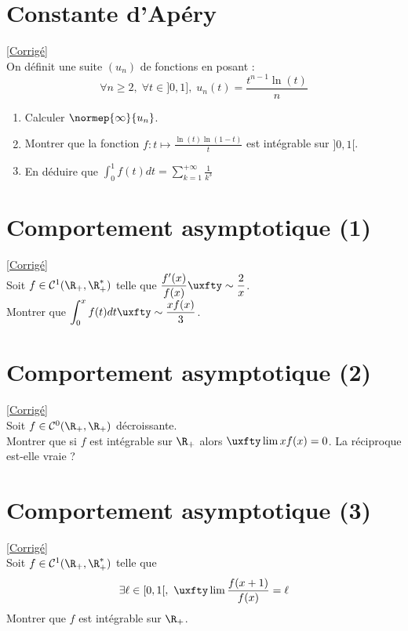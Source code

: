 \documentclass{book}
\begin{document}
	\section{Constante d'Apéry}
	\textcolor{blue}{\hyperref[Constante d'Apéry corrigé]{[Corrigé]}}\\
	\label{Constante d'Apéry}
	On définit une suite $(u_n)$ de fonctions en posant :$$\forall n\geq 2,\; \forall t\in]0,1],\; u_n(t)=\frac{t^{n-1}\ln(t)}{n}$$
	\begin{enumerate}
		\item Calculer $\normep{\infty}{u_n}$.
		\item Montrer que la fonction $\displaystyle f:t\mapsto\frac{\ln(t)\ln(1-t)}{t}$ est intégrable sur $]0,1[$.
		\item En déduire que $\displaystyle\int_0^1f(t)dt=\sum_{k=1}^{+\infty}\frac{1}{k^3}$
	\end{enumerate}
	
	\section{Comportement asymptotique (1)}
	\textcolor{blue}{\hyperref[Comportement asymptotique (1) corrigé]{[Corrigé]}}\\
	\label{Comportement asymptotique (1)}
	Soit $f\in \mathcal C^1(\R_+,\R^*_+)$ telle que $\displaystyle\frac{f'(x)}{f(x)}\uxfty\sim\frac{2}{x}$.\\
	Montrer que $\displaystyle\int_0^xf(t)dt\uxfty\sim\frac{xf(x)}{3}$.
	
	\section{Comportement asymptotique (2)}
	\textcolor{blue}{\hyperref[Comportement asymptotique (2) corrigé]{[Corrigé]}}\\
	\label{Comportement asymptotique (2)}
	Soit $f\in \mathcal C^0(\R_+,\R_+)$ décroissante.\\
	Montrer que si $f$ est intégrable sur $\R_+$ alors $\uxfty\lim xf(x)=0$. La réciproque est-elle vraie ?
	
	\section{Comportement asymptotique (3)}
	\textcolor{blue}{\hyperref[Comportement asymptotique (3) corrigé]{[Corrigé]}}\\
	\label{Comportement asymptotique (3)}
	Soit $f\in \mathcal C^1(\R_+,\R^*_+)$ telle que
	$$\exists \ell\in [0,1[,\ \uxfty\lim\frac{f(x+1)}{f(x)}=\ell$$
	Montrer que $f$ est intégrable sur $\R_+$.
	
\end{document}
